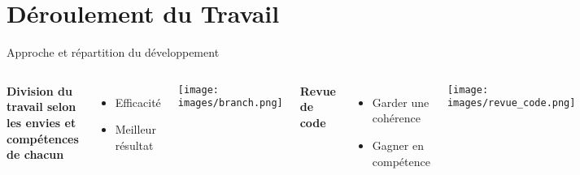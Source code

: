 

\section{Déroulement du Travail}

\begin{frame}{Approche et répartition du développement}
    \begin{columns}[t]
    
    \textbf{Division du travail selon les envies et compétences de chacun}
        \begin{itemize}
            \item Efficacité
            \item Meilleur résultat
        \end{itemize}

    \vspace*{0.5cm}
    \begin{center}
        \hspace*{-0.05\textwidth}
        \texttt{[image: images/branch.png]}
    \end{center}


    \textbf{Revue de code}
        \begin{itemize}
            \item Garder une cohérence
            \item Gagner en compétence
        \end{itemize}
        \vspace{0.3cm}

        \texttt{[image: images/revue\_code.png]}
\end{columns}
  \end{frame}
  

